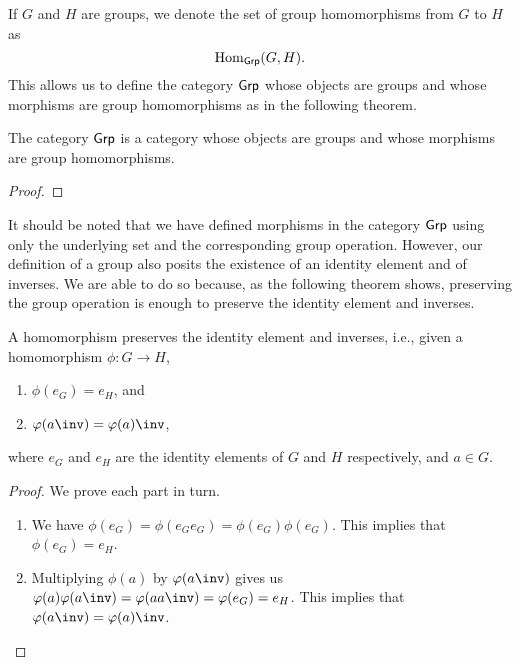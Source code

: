 \begin{definition}
    If \(G\) and \(H\) are groups, we denote the set of group homomorphisms from
    \(G\) to \(H\) as
    \[
        \operatorname{Hom}_{\mathsf{Grp}}(G, H).
    \]
    This allows us to define the category \(\mathsf{Grp}\) whose objects are groups and
    whose morphisms are group homomorphisms as in the following theorem.
\end{definition}

\begin{theorem}
    The category \(\mathsf{Grp}\) is a category whose objects are groups and whose
    morphisms are group homomorphisms.
\end{theorem}

\begin{proof}
    
\end{proof}

It should be noted that we have defined morphisms in the category \(\mathsf{Grp}\) using
only the underlying set and the corresponding group operation. However, our
definition of a group also posits the existence of an identity element and of
inverses. We are able to do so because, as the following theorem shows,
preserving the group operation is enough to preserve the identity element and
inverses.

\begin{theorem}
    A homomorphism preserves the identity element and inverses, i.e., given a
    homomorphism \(\phi: G \to H\),
    \begin{enumerate}[label=(\alph*)]
        \item \(\phi(e_G) = e_H\), and
        \item \(\phi(a\inv) = \phi(a)\inv\),
    \end{enumerate}
    where \(e_G\) and \(e_H\) are the identity elements of \(G\) and \(H\)
    respectively, and \(a \in G\).
\end{theorem}

\begin{proof}
    We prove each part in turn.

    \begin{enumerate}[label=(\alph*), wide]
        \item We have \(\phi(e_G) = \phi(e_G e_G) = \phi(e_G) \phi(e_G)\). This
        implies that \(\phi(e_G) = e_H\).
        \item Multiplying \(\phi(a)\) by \(\phi(a\inv)\) gives us
        \(\phi(a)\phi(a\inv) = \phi(aa\inv) = \phi(e_G) = e_H\). This implies
        that \(\phi(a\inv) = \phi(a)\inv\).
    \end{enumerate}
\end{proof}

